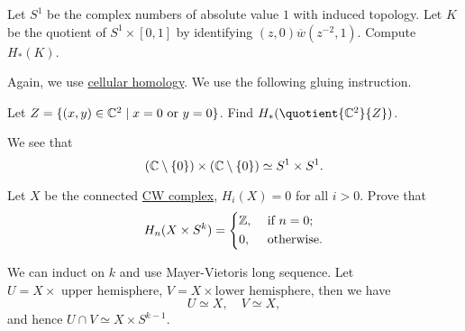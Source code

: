 \begin{exercise}[QR May 2017]
	Let \(S^1\) be the complex numbers of absolute value \(1\) with induced topology. Let \(K\) be the quotient of \(S^1 \times [0, 1]\) by identifying
	\((z, 0)\overline{w} (z^{-2}, 1 )\). Compute \(H_\ast (K)\).
\end{exercise}
\begin{answer}
	Again, we use \hyperref[def:cellular-homology-group]{cellular homology}. We use the following gluing instruction.
	\begin{figure}[H]
		\centering
		\label{fig:ans:ex-3:lec-40}
	\end{figure}
\end{answer}

\begin{exercise}[QR Sep. 2016]
	Let \(Z= \{(x, y)\in \mathbb{\MakeUppercase{c}} ^{2} \mid x = 0 \text{ or } y = 0\}\). Find \(H_\ast (\quotient{\mathbb{\MakeUppercase{c}} ^{2}}{Z})\).
\end{exercise}
\begin{answer}
	We see that
	\[
		(\mathbb{\MakeUppercase{c}} \setminus \{0\})\times (\mathbb{\MakeUppercase{c}} \setminus \{0\}) \simeq S^1 \times S^1.
	\]
\end{answer}

\begin{exercise}[QR May 2017]
	Let \(X\) be the connected \hyperref[def:CW-Complex]{CW complex}, \(H_i(X) = 0\) for all \(i > 0\). Prove that
	\[
		H_n(X \times S^k) = \begin{dcases}
			\mathbb{\MakeUppercase{z}}, & \text{ if } n = 0; \\
			0,                          & \text{ otherwise}.
		\end{dcases}
	\]
\end{exercise}
\begin{answer}
	We can induct on \(k\) and use Mayer-Vietoris long sequence. Let \(U = X \times \text{ upper hemisphere}\), \(V = X \times \text{lower hemisphere}\), then we have
	\[
		U\simeq X,\quad V\simeq X,
	\]
	and hence \(U \cap V \simeq X \times S^{k-1}\).
\end{answer}